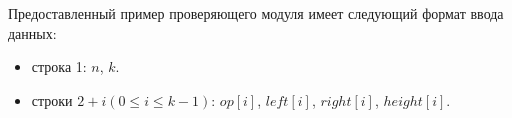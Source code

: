 Предоставленный пример проверяющего модуля имеет следующий формат ввода данных:
\begin{itemize} 
\item строка 1: $n$, $k$.
\item строки $2 + i (0 \le i \le k - 1)$: $op[i]$, $left[i]$, $right[i]$, $height[i]$.
\end{itemize}